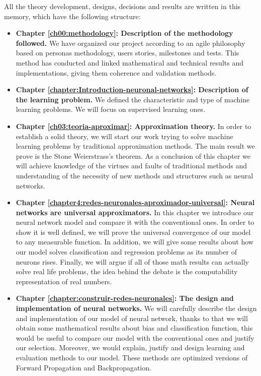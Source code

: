All the theory development, designs, decisions and results are 
written in this memory, which have the following structure: 
\begin{itemize}
 \item \textbf{Chapter \ref{ch00:methodology}: Description of the methodology followed.} We have organized our project according to an agile philosophy  based on personas methodology, users stories, milestones and tests. This method has conducted and linked mathematical and technical results and implementations, giving them coherence and validation methods. 

 \item \textbf{Chapter \ref{chapter:Introduction-neuronal-networks}: Description of the learning problem.} We defined the characteristic and type of machine learning problems. We will focus on supervised learning ones. 

 \item \textbf{Chapter \ref{ch03:teoria-aproximar}:  Approximation theory.} In order to establish a solid theory, we will start our work trying to solve machine learning problems by traditional approximation methods.  The main result we prove is the Stone Weierstrass's theorem. As a conclusion of this chapter we will achieve knowledge of the virtues and faults of traditional methods and understanding of the necessity of new methods and structures such as neural networks. 

 \item \textbf{Chapter \ref{chapter4:redes-neuronales-aproximador-universal}: Neural networks are universal approximators.}  In this chapter we introduce our neural network model and compare it with the conventional ones. In order to show it is well defined, we will prove the universal convergence of our model to any measurable function. In addition, we will give some results about how our model solves classification and regression problems as its number of neurons rises. Finally, we will argue if all of those math results can actually solve real life problems, the idea behind the debate is the computability representation of real numbers. 

 \item \textbf{Chapter  \ref{chapter:construir-redes-neuronales}: The design and implementation of neural networks.} We will carefully  describe the design and implementation of our model of neural network, thanks to that we will obtain some mathematical results about bias and classification function, this would be useful to compare our model with the conventional ones and justify 
our selection. Moreover, we would explain, justify and design  learning and evaluation methods to our model. These methods are optimized versions of Forward Propagation and Backpropagation. 


\end{itemize}
